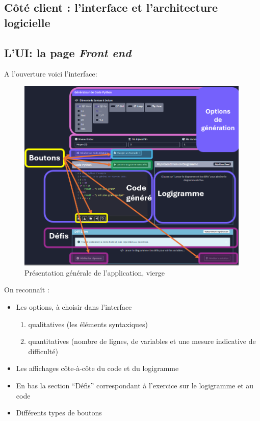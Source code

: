 \documentclass[11pt,a4paper]{article}
\begin{document}
\clearpage
\subsection{Côté client : l'interface et l'architecture logicielle}

\begin{minipage}{\textwidth}
\subsection*{L'UI: la page \textit{Front end}}
A l'ouverture voici l'interface: 
\begin{figure}[H]
    \centering
    \includegraphics[width=0.99\textwidth, keepaspectratio]{app_vide_zones.png}
    \caption{Présentation générale de l'application, vierge}
    \label{app_vide_zones}
\end{figure}

On reconnaît :
\begin{itemize}
    \item Les options, à choisir dans l'interface 
    \begin{enumerate}
        \item qualitatives (les éléments syntaxiques)
        \item quantitatives (nombre de lignes, de variables et une mesure indicative de difficulté)
    \end{enumerate}
    \item Les affichages côte-à-côte du code et du logigramme
    \item En bas la section ``Défis'' correspondant à l'exercice sur le logigramme et au code
    \item Différents types de boutons
\end{itemize}
\end{minipage}
\end{document}
